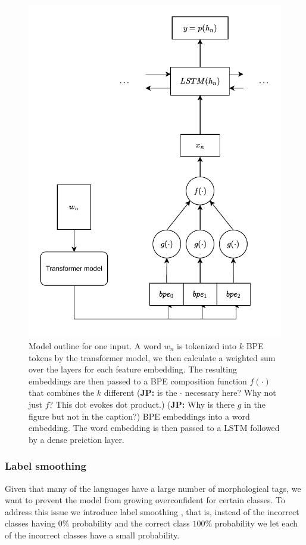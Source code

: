 \documentclass[11pt]{article}
\newcommand\jp[1]{(\textbf{JP:} #1)}
\begin{document}
	\begin{figure}%
          \centering
	\includegraphics[scale=0.5]{single_step.pdf}
        \caption{\label{fig:model} Model outline for one input. A word
     $w_n$ is tokenized into $k$ BPE tokens by the transformer model,
     we then calculate a weighted sum over the layers for each feature
     embedding. The resulting embeddings are then passed to a BPE
     composition function $f(\cdot)$ that combines the $k$ different
     \jp{ is the \(\cdot\) necessary here? Why not just $f$? This dot evokes dot product.}
     \jp{Why is there $g$ in the figure but not in the caption?}
     BPE embeddings into a word embedding. The word embedding is then
     passed to a LSTM followed by a dense preiction layer. }
	\end{figure}

	\subsubsection{Label smoothing}
    	Given that many of the languages have a large number of
     morphological tags, we want to prevent the model from growing
     overconfident for certain classes. To address this issue we
     introduce label smoothing \cite{szegedy2016rethinking}, that is,
     instead of the incorrect classes having $0\%$ probability and the
     correct class $100\%$ probability we let each of the incorrect
     classes have a small probability.
\end{document}
